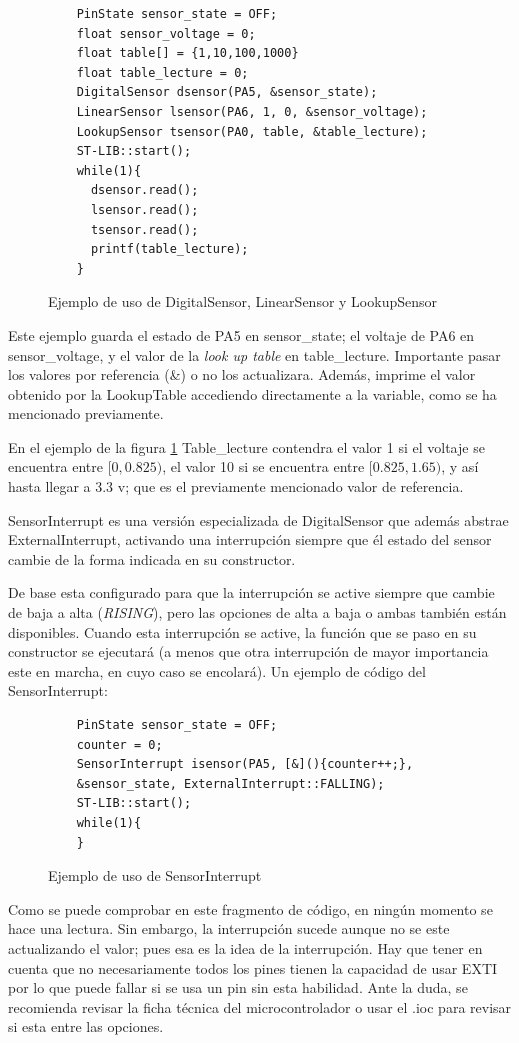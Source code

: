 \documentclass{report}
\begin{document}
\begin{figure}[H]
  \begin{lstlisting}
    PinState sensor_state = OFF;
    float sensor_voltage = 0;
    float table[] = {1,10,100,1000}
    float table_lecture = 0;
    DigitalSensor dsensor(PA5, &sensor_state);
    LinearSensor lsensor(PA6, 1, 0, &sensor_voltage);
    LookupSensor tsensor(PA0, table, &table_lecture);
    ST-LIB::start();
    while(1){
      dsensor.read();
      lsensor.read();
      tsensor.read();
      printf(table_lecture);
    }
  \end{lstlisting}
  \caption{Ejemplo de uso de DigitalSensor, LinearSensor y LookupSensor}
  \label{SensorsCode}
\end{figure}
\par \vspace{0.3cm}
Este ejemplo guarda el estado de PA5 en sensor\_state; el voltaje de PA6 en sensor\_voltage, y el valor de la \textit{look up table} en table\_lecture. Importante pasar los valores por referencia (\&) o no los actualizara. Además, imprime el valor obtenido por la LookupTable accediendo directamente a la variable, como se ha mencionado previamente. \par
En el ejemplo de la figura \ref{SensorsCode} Table\_lecture contendra el valor 1 si el voltaje se encuentra entre $[0, 0.825)$, el valor 10 si se encuentra entre $[0.825, 1.65)$, y así hasta llegar a 3.3 v; que es el previamente mencionado valor de referencia. 
\par \vspace{0.3cm}
SensorInterrupt es una versión especializada de DigitalSensor que además abstrae ExternalInterrupt, activando una interrupción siempre que él estado del sensor cambie de la forma indicada en su constructor. \par 
De base esta configurado para que la interrupción se active siempre que cambie de baja a alta (\textit{RISING}), pero las opciones de alta a baja o ambas también están disponibles. Cuando esta interrupción se active, la función que se paso en su constructor se ejecutará (a menos que otra interrupción de mayor importancia este en marcha, en cuyo caso se encolará).
Un ejemplo de código del SensorInterrupt:
\begin{figure}[H]
  \begin{lstlisting}
    PinState sensor_state = OFF;
    counter = 0;
    SensorInterrupt isensor(PA5, [&](){counter++;}, 
    &sensor_state, ExternalInterrupt::FALLING);
    ST-LIB::start();
    while(1){
    }
  \end{lstlisting}
  \caption{Ejemplo de uso de SensorInterrupt}
  \label{SensorInterruptCode}
\end{figure}
\par \vspace{0.3cm}
Como se puede comprobar en este fragmento de código, en ningún momento se hace una lectura. Sin embargo, la interrupción sucede aunque no se este actualizando el valor; pues esa es la idea de la interrupción. Hay que tener en cuenta que no necesariamente todos los pines tienen la capacidad de usar EXTI por lo que puede fallar si se usa un pin sin esta habilidad. Ante la duda, se recomienda revisar la ficha técnica del microcontrolador o usar el .ioc para revisar si esta entre las opciones. 
\end{document}

